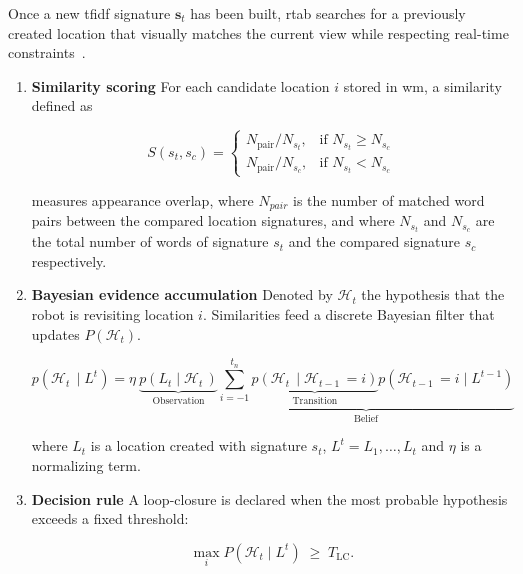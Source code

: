 Once a new \gls{tfidf} signature $\mathbf{s}_t$ has been built, \gls{rtab}
searches for a previously created location that visually matches the current
view while respecting real-time constraints~\cite{6459608}.

\begin{enumerate}[label=\alph*)]
  \item \textbf{Similarity scoring}
        For each candidate location $i$ stored in \gls{wm}, a similarity defined as

        \begin{equation}
          S(s_t, s_c) =
          \begin{cases}
            N_{\text{pair}} / N_{s_t}, & \text{if } N_{s_t} \geq N_{s_c} \\
            N_{\text{pair}} / N_{s_c}, & \text{if } N_{s_t} < N_{s_c}
          \end{cases}
        \end{equation}

        measures appearance overlap, where $N_{pair}$ is the number of matched word pairs between
        the compared location signatures, and where $N_{s_t}$ and $N_{s_c}$ are
        the total number of words of signature $s_t$ and the compared
        signature $s_c$ respectively.

  \item \textbf{Bayesian evidence accumulation}
        Denoted by $\mathcal{H}_t$ the hypothesis that the robot is revisiting location $i$.
        Similarities feed a discrete Bayesian filter that updates $P(\mathcal{H}_t)$.


        \begin{equation}
          p(\mathcal{H}_t\!\, \mid L^t) = \eta~\underbrace{p(L_t \mid \mathcal{H}_t\!\,)}_{\text{Observation}}
          \underbrace{\sum_{i=-1}^{t_n}
            \underbrace{p(\mathcal{H}_t\!\, \mid \mathcal{H}_{t-1}\!\, = i)}_{\text{Transition}}
            p(\mathcal{H}_{t-1}\!\, = i \mid L^{t-1})}_{\text{Belief}}
        \end{equation}

        where $L_t$ is a location created with signature $s_t$, $L^t=L_1,\dots,L_t$ and $\eta$ is a normalizing term.

  \item \textbf{Decision rule}
        A loop-closure is declared when the most probable hypothesis exceeds a fixed
        threshold:

        \begin{equation}
          \max_i P(\mathcal{H}_t \mid L^t) \;\ge\; T_{\mathrm{LC}}.
          \label{eq:lc-threshold}
        \end{equation}


\end{enumerate}
